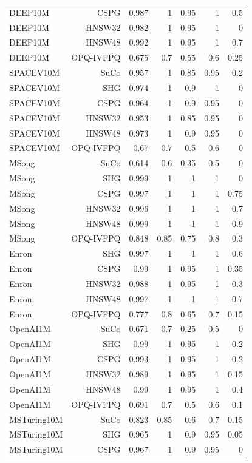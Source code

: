 \begin{table}[t]
\begin{tabular}{lrrrrrr}
DEEP10M & CSPG & 0.987 & 1 & 0.95 & 1 & 0.5 \\
DEEP10M & HNSW32 & 0.982 & 1 & 0.95 & 1 & 0 \\
DEEP10M & HNSW48 & 0.992 & 1 & 0.95 & 1 & 0.7 \\
DEEP10M & OPQ-IVFPQ & 0.675 & 0.7 & 0.55 & 0.6 & 0.25 \\
SPACEV10M & SuCo & 0.957 & 1 & 0.85 & 0.95 & 0.2 \\
SPACEV10M & SHG & 0.974 & 1 & 0.9 & 1 & 0 \\
SPACEV10M & CSPG & 0.964 & 1 & 0.9 & 0.95 & 0 \\
SPACEV10M & HNSW32 & 0.953 & 1 & 0.85 & 0.95 & 0 \\
SPACEV10M & HNSW48 & 0.973 & 1 & 0.9 & 0.95 & 0 \\
SPACEV10M & OPQ-IVFPQ & 0.67 & 0.7 & 0.5 & 0.6 & 0 \\
MSong & SuCo & 0.614 & 0.6 & 0.35 & 0.5 & 0 \\
MSong & SHG & 0.999 & 1 & 1 & 1 & 0 \\
MSong & CSPG & 0.997 & 1 & 1 & 1 & 0.75 \\
MSong & HNSW32 & 0.996 & 1 & 1 & 1 & 0.7 \\
MSong & HNSW48 & 0.999 & 1 & 1 & 1 & 0.9 \\
MSong & OPQ-IVFPQ & 0.848 & 0.85 & 0.75 & 0.8 & 0.3 \\
Enron & SHG & 0.997 & 1 & 1 & 1 & 0.6 \\
Enron & CSPG & 0.99 & 1 & 0.95 & 1 & 0.35 \\
Enron & HNSW32 & 0.988 & 1 & 0.95 & 1 & 0.3 \\
Enron & HNSW48 & 0.997 & 1 & 1 & 1 & 0.7 \\
Enron & OPQ-IVFPQ & 0.777 & 0.8 & 0.65 & 0.7 & 0.15 \\
OpenAI1M & SuCo & 0.671 & 0.7 & 0.25 & 0.5 & 0 \\
OpenAI1M & SHG & 0.99 & 1 & 0.95 & 1 & 0.2 \\
OpenAI1M & CSPG & 0.993 & 1 & 0.95 & 1 & 0.2 \\
OpenAI1M & HNSW32 & 0.989 & 1 & 0.95 & 1 & 0.15 \\
OpenAI1M & HNSW48 & 0.99 & 1 & 0.95 & 1 & 0.4 \\
OpenAI1M & OPQ-IVFPQ & 0.691 & 0.7 & 0.5 & 0.6 & 0.1 \\
MSTuring10M & SuCo & 0.823 & 0.85 & 0.6 & 0.7 & 0.15 \\
MSTuring10M & SHG & 0.965 & 1 & 0.9 & 0.95 & 0.05 \\
MSTuring10M & CSPG & 0.967 & 1 & 0.9 & 0.95 & 0 \\

\end{tabular}
\end{table}
